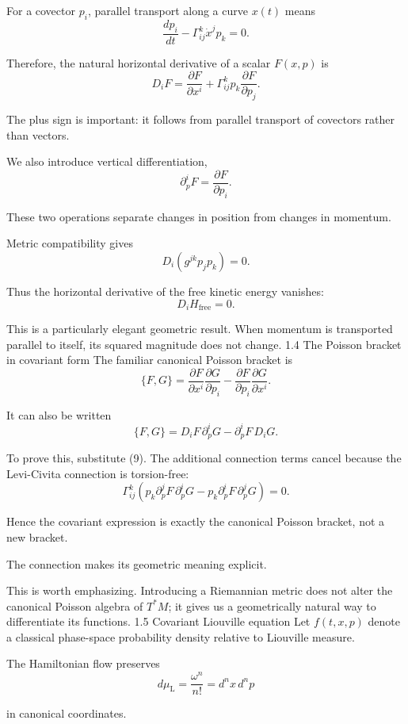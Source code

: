 For a covector \(p_i\), parallel transport along a curve \(x(t)\) means
\[
\frac{dp_i}{dt}
-\Gamma^k_{ij}\dot x^j p_k=0.
\tag{8}
\]

Therefore, the natural horizontal derivative of a scalar \(F(x,p)\) is
\[
\boxed{
D_iF=
\frac{\partial F}{\partial x^i}
+
\Gamma^k_{ij}p_k
\frac{\partial F}{\partial p_j}.
}
\tag{9}
\]

The plus sign is important: it follows from parallel transport of covectors rather than vectors.

We also introduce vertical differentiation,
\[
\partial_p^i F=\frac{\partial F}{\partial p_i}.
\tag{10}
\]

These two operations separate changes in position from changes in momentum.

Metric compatibility gives
\[
D_i(g^{jk}p_jp_k)=0.
\tag{11}
\]

Thus the horizontal derivative of the free kinetic energy vanishes:
\[
D_i H_{\mathrm{free}}=0.
\]

This is a particularly elegant geometric result. When momentum is transported parallel to itself, its squared magnitude does not change.
1.4 The Poisson bracket in covariant form
The familiar canonical Poisson bracket is
\[
\{F,G\}
=
\frac{\partial F}{\partial x^i}
\frac{\partial G}{\partial p_i}
-
\frac{\partial F}{\partial p_i}
\frac{\partial G}{\partial x^i}.
\tag{12}
\]

It can also be written
\[
\boxed{
\{F,G\}
=
D_iF\,\partial_p^iG
-
\partial_p^iF\,D_iG.
}
\tag{13}
\]

To prove this, substitute (9). The additional connection terms cancel because the Levi-Civita connection is torsion-free:
\[
\Gamma^k_{ij}
\left(
p_k\partial_p^jF\,\partial_p^iG
-
p_k\partial_p^iF\,\partial_p^jG
\right)=0.
\]

Hence the covariant expression is exactly the canonical Poisson bracket, not a new bracket.

The connection makes its geometric meaning explicit.

This is worth emphasizing. Introducing a Riemannian metric does not alter the canonical Poisson algebra of \(T^*M\); it gives us a geometrically natural way to differentiate its functions.
1.5 Covariant Liouville equation
Let \(f(t,x,p)\) denote a classical phase-space probability density relative to Liouville measure.

The Hamiltonian flow preserves
\[
d\mu_{\mathrm L}
=\frac{\omega^n}{n!}
=d^nx\,d^np
\]

in canonical coordinates.

